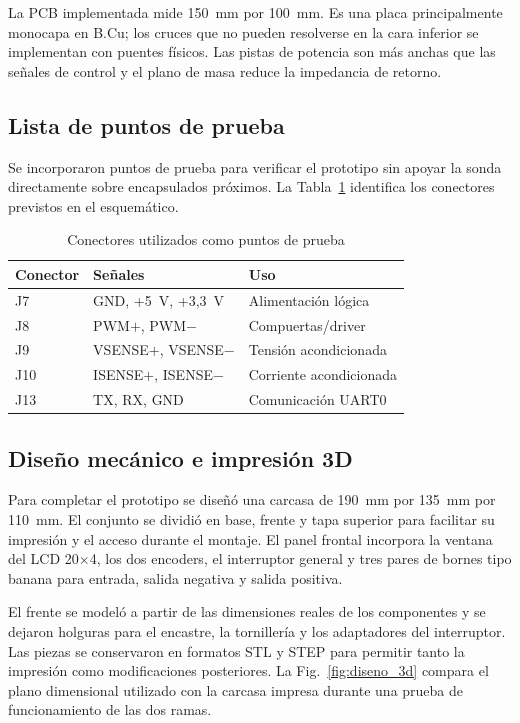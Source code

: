 \documentclass[conference]{IEEEtran}
\begin{document}
La PCB implementada mide 150~mm por 100~mm. Es una placa principalmente monocapa en B.Cu; los cruces que no pueden resolverse en la cara inferior se implementan con puentes físicos. Las pistas de potencia son más anchas que las señales de control y el plano de masa reduce la impedancia de retorno.

\subsection{Lista de puntos de prueba}

Se incorporaron puntos de prueba para verificar el prototipo sin apoyar la sonda directamente sobre encapsulados próximos. La Tabla~\ref{tab:testpoints} identifica los conectores previstos en el esquemático.

\begin{table}[!t]
\caption{Conectores utilizados como puntos de prueba}
\label{tab:testpoints}
\centering
\footnotesize
\begin{tabular}{@{}lll@{}}
\toprule
\textbf{Conector} & \textbf{Señales} & \textbf{Uso} \\
\midrule
J7 & GND, +5~V, +3,3~V & Alimentación lógica \\
J8 & PWM$+$, PWM$-$ & Compuertas/driver \\
J9 & VSENSE$+$, VSENSE$-$ & Tensión acondicionada \\
J10 & ISENSE$+$, ISENSE$-$ & Corriente acondicionada \\
J13 & TX, RX, GND & Comunicación UART0 \\
\bottomrule
\end{tabular}
\end{table}

\subsection{Diseño mecánico e impresión 3D}

Para completar el prototipo se diseñó una carcasa de 190~mm por 135~mm por 110~mm. El conjunto se dividió en base, frente y tapa superior para facilitar su impresión y el acceso durante el montaje. El panel frontal incorpora la ventana del LCD 20$\times$4, los dos encoders, el interruptor general y tres pares de bornes tipo banana para entrada, salida negativa y salida positiva.

El frente se modeló a partir de las dimensiones reales de los componentes y se dejaron holguras para el encastre, la tornillería y los adaptadores del interruptor. Las piezas se conservaron en formatos STL y STEP para permitir tanto la impresión como modificaciones posteriores. La Fig.~\ref{fig:diseno_3d} compara el plano dimensional utilizado con la carcasa impresa durante una prueba de funcionamiento de las dos ramas.
\end{document}
